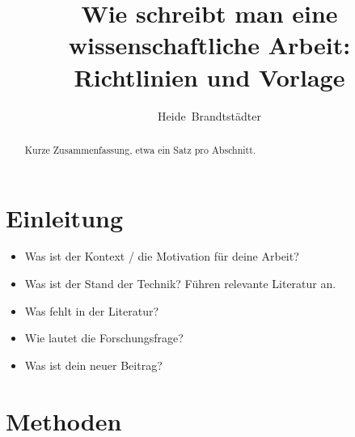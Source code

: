 \documentclass[a4paper, 11pt]{IEEEtran}
\title{\LARGE \bf Wie schreibt man eine wissenschaftliche Arbeit: Richtlinien und Vorlage}
\author
{
	Heide~Brandtstädter%
}
\begin{document}
\fancyhf{} %
\fancyfoot[C]{\thepage} %
\maketitle
\thispagestyle{fancy}%
\pagestyle{plain}%






\begin{abstract}
Kurze Zusammenfassung, etwa ein Satz pro Abschnitt. 
\end{abstract}




\section{Einleitung}

\begin{itemize}
\item Was ist der Kontext / die Motivation für deine Arbeit?
\item Was ist der Stand der Technik? Führen relevante Literatur an.
\item Was fehlt in der Literatur? 
\item Wie lautet die Forschungsfrage?
\item Was ist dein neuer Beitrag?
\end{itemize}


\section{Methoden}
\end{document}
